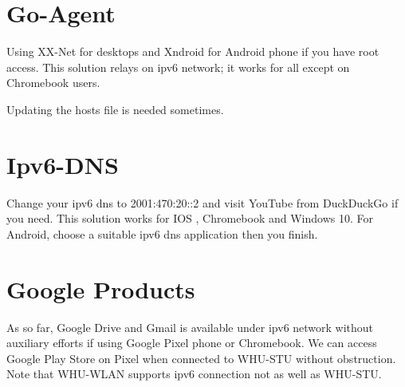 \documentclass{ctexart}
\begin{document}
\section{Go-Agent}\label{method:xxnet}
Using XX-Net for desktops and Xndroid for Android  phone if you have root access. This solution relays on ipv6 network; it works for all  except on Chromebook users.

Updating the hosts file is needed sometimes.
\section{Ipv6-DNS}\label{method:dns}
Change your ipv6 dns to 2001:470:20::2 and visit YouTube from DuckDuckGo if you need. This solution works for IOS , Chromebook 
and Windows 10. For Android, choose a suitable ipv6 dns application then you finish.
\section*{Google Products}
As so far, Google Drive and Gmail is available under ipv6 network without auxiliary efforts if using Google Pixel phone or Chromebook. We can access Google Play Store on Pixel when connected to WHU-STU without obstruction. Note that WHU-WLAN supports ipv6 connection not as well as WHU-STU.
\end{document}
